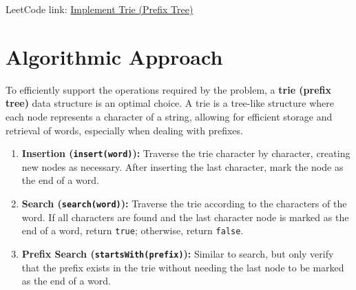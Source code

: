 LeetCode link: \href{https://leetcode.com/problems/implement-trie-prefix-tree/}{Implement Trie (Prefix Tree)}


\section*{Algorithmic Approach}

To efficiently support the operations required by the problem, a \textbf{trie (prefix tree)} data structure is an optimal choice. A trie is a tree-like structure where each node represents a character of a string, allowing for efficient storage and retrieval of words, especially when dealing with prefixes.

\begin{enumerate}
    \item \textbf{Insertion (\texttt{insert(word)}):}  
    Traverse the trie character by character, creating new nodes as necessary. After inserting the last character, mark the node as the end of a word.
    
    \item \textbf{Search (\texttt{search(word)}):}  
    Traverse the trie according to the characters of the word. If all characters are found and the last character node is marked as the end of a word, return \texttt{true}; otherwise, return \texttt{false}.
    
    \item \textbf{Prefix Search (\texttt{startsWith(prefix)}):}  
    Similar to search, but only verify that the prefix exists in the trie without needing the last node to be marked as the end of a word.
\end{enumerate}



